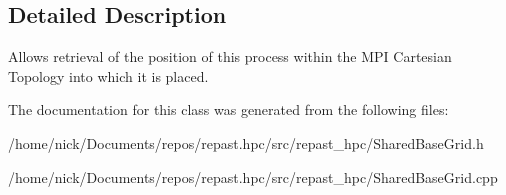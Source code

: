 \subsection{Detailed Description}
Allows retrieval of the position of this process within the M\-P\-I Cartesian Topology into which it is placed. 

The documentation for this class was generated from the following files\-:\begin{DoxyCompactItemize}
\item 
/home/nick/\-Documents/repos/repast.\-hpc/src/repast\-\_\-hpc/Shared\-Base\-Grid.\-h\item 
/home/nick/\-Documents/repos/repast.\-hpc/src/repast\-\_\-hpc/Shared\-Base\-Grid.\-cpp\end{DoxyCompactItemize}
